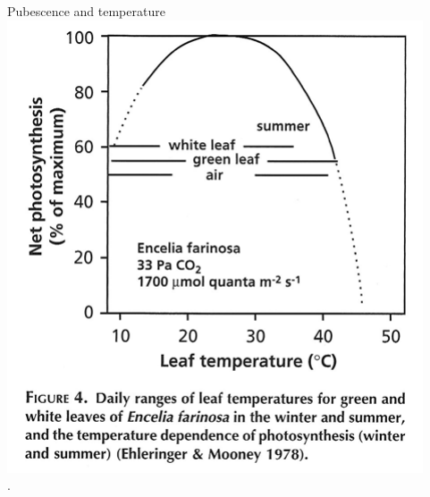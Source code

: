 \documentclass[10pt]{beamer}
\begin{document}
\begin{frame}{Pubescence and temperature}
    \centering\includegraphics[height=0.7\textheight]{figures/Lambers4Encelia}\\
    {\small \autocite[from][]{LambersEtAl1998}.}
\end{frame}
\end{document}

